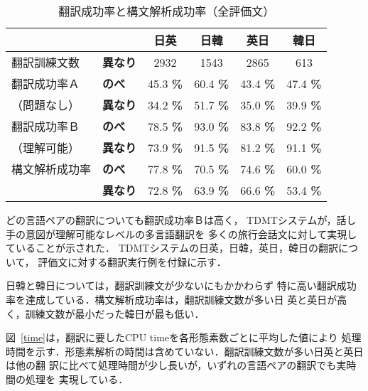 \begin{table}[bht]
\begin{center}
 \caption{翻訳成功率と構文解析成功率（全評価文）}
 \label{rate-all}
\begin{small}
\begin{tabular}{|ll||c|c|c|c|} \hline
&& 日英  & 日韓 & 英日 & 韓日 \\   \hline
翻訳訓練文数&{\scriptsize\bf 異なり} & 2932 & 1543 & 2865 & 613\\ \hline
翻訳成功率Ａ & {\scriptsize\bf のべ} & 
        45.3 {\tiny\bf \%} & 60.4 {\tiny\bf \%} & 43.4 {\tiny\bf \%} & 47.4 {\tiny\bf \%} \\ 
（問題なし）& {\scriptsize\bf 異なり} & 
        34.2  {\tiny\bf \%} & 51.7 {\tiny\bf \%}& 35.0 {\tiny\bf \%} & 39.9 {\tiny\bf \%}\\ \hline
翻訳成功率Ｂ & {\scriptsize\bf のべ} & 
        78.5 {\tiny\bf \%} & 93.0 {\tiny\bf \%} & 83.8 {\tiny\bf \%} & 92.2 {\tiny\bf \%} \\ 
（理解可能）& {\scriptsize\bf 異なり} & 
        73.9 {\tiny\bf \%} & 91.5 {\tiny\bf \%} & 81.2 {\tiny\bf \%} & 91.1 {\tiny\bf \%}\\
\hline
構文解析成功率 &{\scriptsize\bf のべ} & 
        77.8 {\tiny\bf \%} & 70.5 {\tiny\bf \%} & 74.6 {\tiny\bf \%} & 60.0 {\tiny\bf \%}\\ 
& {\scriptsize\bf 異なり} & 
        72.8 {\tiny\bf \%} & 63.9 {\tiny\bf \%} & 66.6 {\tiny\bf \%} & 53.4 {\tiny\bf \%}\\    \hline
\end{tabular}
\end{small}
\end{center}
\end{table}

どの言語ペアの翻訳についても翻訳成功率Ｂは高く，
TDMTシステムが，話し手の意図が理解可能なレベルの多言語翻訳を
多くの旅行会話文に対して実現していることが示された．
TDMTシステムの日英，日韓，英日，韓日の翻訳について，
評価文に対する翻訳実行例を付録に示す．

日韓と韓日については，翻訳訓練文が少ないにもかかわらず
特に高い翻訳成功率を達成している．構文解析成功率は，翻訳訓練文数が多い日
英と英日が高く，訓練文数が最小だった韓日が最も低い．

図~\ref{time}は，翻訳に要したCPU timeを各形態素数ごとに平均した値により
処理時間を示す．形態素解析の時間は含めていない．翻訳訓練文数が多い日英と英日は他の翻
訳に比べて処理時間が少し長いが，いずれの言語ペアの翻訳でも実時間の処理を
実現している．

